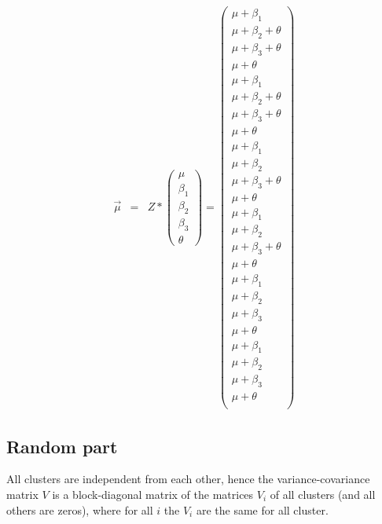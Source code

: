 \documentclass{article}
\begin{document}
\begin{eqnarray*}
\overrightarrow{\mu}
&=&  Z*
\left(\begin{array}{ccc}
 \mu	\\
 \beta_{1}	\\
 \beta_{2}	\\
 \beta_{3}  \\
 \theta
 \end{array}\right) 
=
 \left(
 \begin{array}{c}
 \mu +\beta_{1}	 \\
  \mu	+\beta_{2}	+\theta\\
  \mu  +\beta_{3}	+\theta\\
  \mu	 +\theta\\
  \mu +\beta_{1}	 \\
  \mu	+\beta_{2}	+\theta\\
  \mu  +\beta_{3}	+\theta\\
  \mu	 +\theta\\
    \mu	+\beta_{1}	\\
     \mu	+\beta_{2}	 \\
     \mu  +\beta_{3}	+\theta\\
      \mu	 +\theta\\
      \mu	+\beta_{1}	\\
     \mu	+\beta_{2}	 \\
     \mu  +\beta_{3}	+\theta\\
      \mu	 +\theta \\   
      \mu  +\beta_{1}	\\
     \mu	+\beta_{2}	 \\
     \mu  +\beta_{3}	\\
      \mu	 +\theta\\
      \mu	+\beta_{1}	\\
     \mu	+\beta_{2}	 \\
     \mu  +\beta_{3}	\\
      \mu	 +\theta \\   
 \end{array}\right) 
\end{eqnarray*}


\subsection{Random part}


All clusters are independent from each other, 
hence the variance-covariance matrix $V$ is a block-diagonal matrix of the matrices $V_{i}$ of all clusters (and all others are zeros), 
where for all $i$ the $V_{i}$ are the same for all cluster. 
\end{document}
